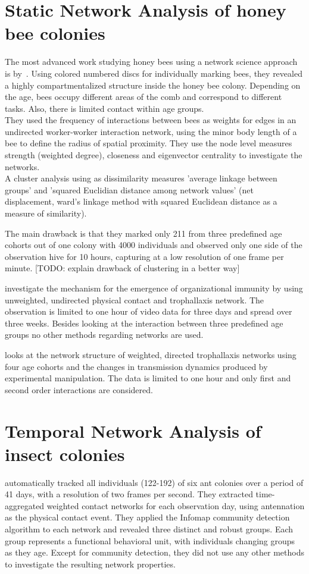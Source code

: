 \section{Static Network Analysis of honey bee colonies}
The most advanced work studying honey bees using a network science approach is by~\textcite{baracchi2014socio}. Using colored numbered discs for individually marking bees, they revealed a highly compartmentalized structure inside the honey bee colony. Depending on the age, bees occupy different areas of the comb and correspond to different tasks. Also, there is limited contact within age groups.\\
They used the frequency of interactions between bees as weights for edges in an undirected worker-worker interaction network, using the minor body length of a bee to define the radius of spatial proximity.
They use the node level measures strength (weighted degree), closeness and eigenvector centrality to investigate the networks.\\
A cluster analysis using as dissimilarity measures 'average linkage between groups' and 'squared Euclidian distance among network values' (net displacement, ward's linkage method with squared Euclidean distance as a measure of similarity).

The main drawback is that they marked only 211 from three predefined age cohorts out of one colony with 4000 individuals and observed only one side of the observation hive for 10 hours, capturing at a low resolution of one frame per minute. [TODO: explain drawback of clustering in a better way]

\textcite{scholl2011olfactory} investigate the mechanism for the emergence of organizational immunity by using unweighted, undirected physical contact and trophallaxis network. The observation is limited to one hour of video data for three days and spread over three weeks. Besides looking at the interaction between three predefined age groups no other methods regarding networks are used.

\textcite{naug2008structure} looks at the network structure of weighted,  directed trophallaxis networks using four age cohorts and the changes in transmission dynamics produced by experimental manipulation. The data is limited to one hour and only first and second order interactions are considered.


\section{Temporal Network Analysis of insect colonies}
\textcite{mersch2013tracking} automatically tracked all individuals (122-192) of six ant colonies over a period of 41 days, with a resolution of two frames per second. They extracted time-aggregated weighted contact networks for each observation day, using antennation as the physical contact event. They applied the Infomap community detection algorithm to each network and revealed three distinct and robust groups. Each group represents a functional behavioral unit, with individuals changing groups as they age.
Except for community detection, they did not use any other methods to investigate the resulting network properties.


